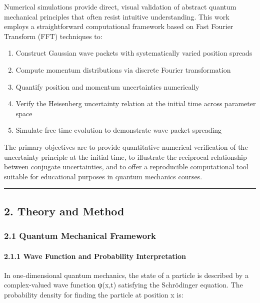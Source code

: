 \documentclass[
]{article}
\providecommand{\tightlist}{%
  \setlength{\itemsep}{0pt}\setlength{\parskip}{0pt}}
\begin{document}
Numerical simulations provide direct, visual validation of abstract
quantum mechanical principles that often resist intuitive understanding.
This work employs a straightforward computational framework based on
Fast Fourier Transform (FFT) techniques to:

\begin{enumerate}
\def\labelenumi{\arabic{enumi}.}
\tightlist
\item
  Construct Gaussian wave packets with systematically varied position
  spreads
\item
  Compute momentum distributions via discrete Fourier transformation
\item
  Quantify position and momentum uncertainties numerically
\item
  Verify the Heisenberg uncertainty relation at the initial time across
  parameter space
\item
  Simulate free time evolution to demonstrate wave packet spreading
\end{enumerate}

The primary objectives are to provide quantitative numerical
verification of the uncertainty principle at the initial time, to
illustrate the reciprocal relationship between conjugate uncertainties,
and to offer a reproducible computational tool suitable for educational
purposes in quantum mechanics courses.

\begin{center}\rule{0.5\linewidth}{0.5pt}\end{center}

\subsection{2. Theory and Method}\label{theory-and-method}

\subsubsection{2.1 Quantum Mechanical
Framework}\label{quantum-mechanical-framework}

\paragraph{2.1.1 Wave Function and Probability
Interpretation}\label{wave-function-and-probability-interpretation}

In one-dimensional quantum mechanics, the state of a particle is
described by a complex-valued wave function ψ(x,t) satisfying the
Schrödinger equation. The probability density for finding the particle
at position x is:
\end{document}

